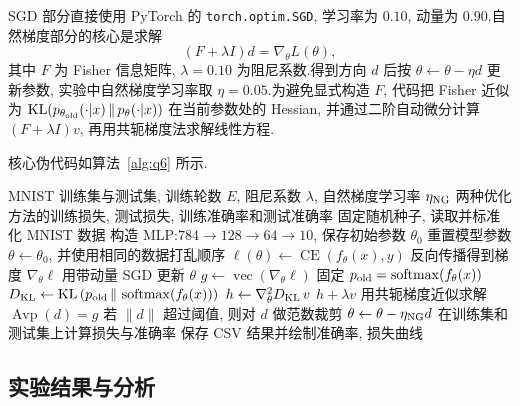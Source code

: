 ﻿\documentclass[UTF8,  zihao=-4]{ctexart}
\begin{document}
SGD 部分直接使用 PyTorch 的 \texttt{torch.optim.SGD},  学习率为 \(0.10\),  动量为 \(0.90\).自然梯度部分的核心是求解
\[
    (F+\lambda I)d=\nabla_\theta L(\theta),  
\]
其中 \(F\) 为 Fisher 信息矩阵,  \(\lambda=0.10\) 为阻尼系数.得到方向 \(d\) 后按
$
    \theta \leftarrow \theta-\eta d
$
更新参数,  实验中自然梯度学习率取 \(\eta=0.05\).为避免显式构造 \(F\),  代码把 Fisher 近似为
$
    \operatorname{KL}\!\left(p_{\theta_{\rm old}}(\cdot|x)\,  \|\,  p_\theta(\cdot|x)\right)
$
在当前参数处的 Hessian,  并通过二阶自动微分计算 \((F+\lambda I)v\),  再用共轭梯度法求解线性方程.

核心伪代码如算法~\ref{alg:q6} 所示.

\begin{algorithm}[htbp]
\caption{第6题 SGD 与阻尼自然梯度训练流程}
\label{alg:q6}
\small
\begin{algorithmic}[1]
\Require MNIST 训练集与测试集,  训练轮数 \(E\),  阻尼系数 \(\lambda\),  自然梯度学习率 \(\eta_{\rm NG}\)
\Ensure 两种优化方法的训练损失,  测试损失,  训练准确率和测试准确率
\State 固定随机种子,  读取并标准化 MNIST 数据
\State 构造 MLP:\(784\to128\to64\to10\),  保存初始参数 \(\theta_0\)
    \State 重置模型参数 \(\theta\gets\theta_0\),  并使用相同的数据打乱顺序
            \State \(\ell(\theta)\gets \operatorname{CE}(f_\theta(x),  y)\)
                \State 反向传播得到梯度 \(\nabla_\theta\ell\)
                \State 用带动量 SGD 更新 \(\theta\)
            \Else
                \State \(g\gets \operatorname{vec}(\nabla_\theta\ell)\)
                \State 固定 \(p_{\rm old}=\operatorname{softmax}(f_\theta(x))\)
                    \State \(D_{\rm KL}\gets {\rm KL}\left(p_{\rm old}\,  \|\,  \operatorname{softmax}(f_\theta(x))\right)\)
                    \State \(h\gets \nabla_\theta^2D_{\rm KL}\,  v\)
                    \State \Return \(h+\lambda v\)
                \EndFunction
                \State 用共轭梯度近似求解 \(\operatorname{Avp}(d)=g\)
                \State 若 \(\|d\|\) 超过阈值,  则对 \(d\) 做范数裁剪
                \State \(\theta\gets\theta-\eta_{\rm NG}d\)
            \EndIf
        \EndFor
        \State 在训练集和测试集上计算损失与准确率
    \EndFor
\EndFor
\State 保存 CSV 结果并绘制准确率,  损失曲线
\end{algorithmic}
\end{algorithm}

\subsection{实验结果与分析}
\end{document}
